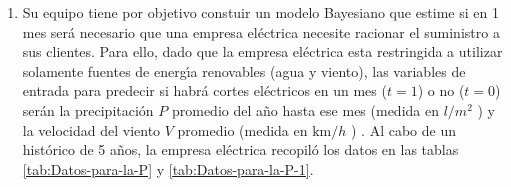 \documentclass[spanish,english]{article}
\begin{document}
\begin{enumerate}
\item Su equipo tiene por objetivo constuir un modelo Bayesiano que estime
si en 1 mes ser\'{a} necesario que una empresa el\'{e}ctrica necesite
racionar el suministro a sus clientes. Para ello, dado que la empresa
el\'{e}ctrica esta restringida a utilizar solamente fuentes de energ\'{\i}a
renovables (agua y viento), las variables de entrada para predecir
si habr\'{a} cortes el\'{e}ctricos en un mes ($t=1$) o no ($t=0$)
ser\'{a}n la precipitaci\'{o}n $P$ promedio del a\~{n}o hasta ese
mes (medida en $l/m^{2}$ ) y la velocidad del viento $V$ promedio
(medida en $\textrm{km}/h$ ) . Al cabo de un hist\'{o}rico de 5 a\~{n}os,
la empresa el\'{e}ctrica recopil\'{o} los datos en las tablas \ref{tab:Datos-para-la-P}
y \ref{tab:Datos-para-la-P-1}.


\end{enumerate}
\end{document}

